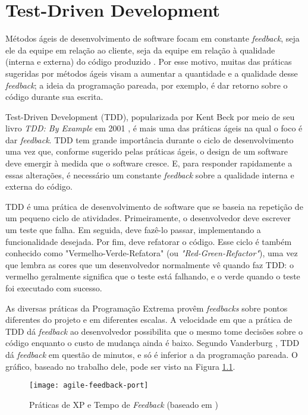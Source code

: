 \chapter{Test-Driven Development}
\label{cap:tdd}

Métodos ágeis de desenvolvimento de software focam em constante
\textit{feedback}, seja ele da equipe em relação ao cliente, seja da equipe em relação à
qualidade (interna e externa) do código produzido \cite{AgileManifesto}. Por
esse motivo, muitas das práticas sugeridas por métodos ágeis visam a aumentar a 
quantidade e a qualidade desse \textit{feedback}; a ideia da programação pareada, por
exemplo, é dar retorno sobre o código durante sua escrita.

Test-Driven Development (TDD), popularizada por Kent Beck por meio de seu livro
\textit{TDD: By Example} em 2001 \cite{TDDByExample}, é mais uma das práticas
ágeis na qual o foco é dar \textit{feedback}. TDD tem grande importância durante o ciclo
de desenvolvimento uma vez que, conforme sugerido pelas práticas ágeis, o design de um
software deve emergir à medida que o software cresce. E, para responder
rapidamente a essas alterações, é necessário um constante \textit{feedback} sobre a
qualidade interna e externa do código.

TDD é uma prática de desenvolvimento de software que se baseia na repetição de
um pequeno ciclo de atividades. Primeiramente, o desenvolvedor deve escrever um
teste que falha. Em seguida, deve fazê-lo passar, implementando a
funcionalidade desejada. Por fim, deve refatorar o código. Esse ciclo
é também conhecido como 
"Vermelho-Verde-Refatora" (ou \textit{"Red-Green-Refactor"}), uma vez que lembra as cores que um 
desenvolvedor normalmente vê quando faz TDD: o vermelho geralmente significa que
o teste está falhando, e o verde quando o teste foi executado com sucesso.

As diversas práticas da Programação Extrema provêm \textit{feedbacks} sobre pontos diferentes 
do projeto e em diferentes escalas. 
A velocidade em que a prática de TDD dá \textit{feedback} ao desenvolvedor possibilita que o mesmo
tome decisões sobre o código enquanto o custo de mudança ainda é
baixo. Segundo Vanderburg \cite{vanderburg}, TDD dá \textit{feedback} em questão de
minutos, e só é inferior a da programação pareada. O gráfico,
baseado no trabalho dele, pode ser visto na Figura
\ref{fig:agile-feedback}.

\begin{figure}
  \centering
  \texttt{[image: agile-feedback-port]}
  \caption{Práticas de XP e Tempo de \textit{Feedback} (baseado em \cite{vanderburg})}
  \label{fig:agile-feedback}
\end{figure}

